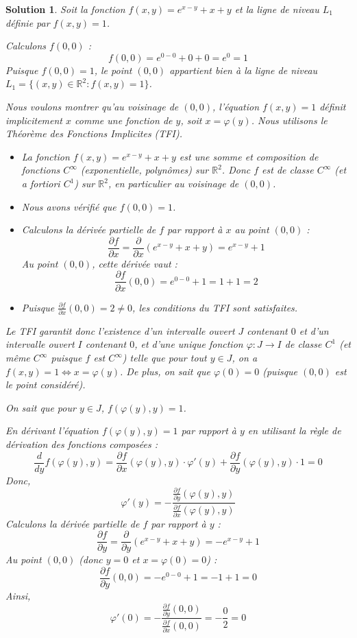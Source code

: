 \documentclass[10pt]{article}
\theoremstyle{frenchstyle}
\newtheorem{solution}{Solution}
\begin{document}
\begin{solution}

	Soit la fonction $f(x,y) = e^{x - y} + x + y$ et la ligne de niveau $L_1$ définie par $f(x,y) = 1$.

	Calculons $f(0,0)$ :
	\[
		f(0,0) = e^{0-0} + 0 + 0 = e^0 = 1
	\]
	Puisque $f(0,0) = 1$, le point $(0,0)$ appartient bien à la ligne de niveau $L_1 = \{(x,y) \in \mathbb{R}^2 : f(x,y) = 1\}$.

	Nous voulons montrer qu'au voisinage de $(0,0)$, l'équation $f(x,y) = 1$ définit implicitement $x$ comme une fonction de $y$, soit $x = \varphi(y)$. Nous utilisons le Théorème des Fonctions Implicites (TFI).
	\begin{itemize}
		\item La fonction $f(x,y) = e^{x-y} + x + y$ est une somme et composition de fonctions $C^\infty$ (exponentielle, polynômes) sur $\mathbb{R}^2$. Donc $f$ est de classe $C^\infty$ (et a fortiori $C^1$) sur $\mathbb{R}^2$, en particulier au voisinage de $(0,0)$.
		\item Nous avons vérifié que $f(0,0) = 1$.
		\item Calculons la dérivée partielle de $f$ par rapport à $x$ au point $(0,0)$ :
		      \[
			      \frac{\partial f}{\partial x} = \frac{\partial}{\partial x} (e^{x-y} + x + y) = e^{x-y} + 1
		      \]
		      Au point $(0,0)$, cette dérivée vaut :
		      \[
			      \frac{\partial f}{\partial x}(0,0) = e^{0-0} + 1 = 1 + 1 = 2
		      \]
		\item Puisque $\frac{\partial f}{\partial x}(0,0) = 2 \neq 0$, les conditions du TFI sont satisfaites.
	\end{itemize}
	Le TFI garantit donc l'existence d'un intervalle ouvert $J$ contenant $0$ et d'un intervalle ouvert $I$ contenant $0$, et d'une unique fonction $\varphi : J \to I$ de classe $C^1$ (et même $C^\infty$ puisque $f$ est $C^\infty$) telle que pour tout $y \in J$, on a $f(x,y) = 1 \iff x = \varphi(y)$. De plus, on sait que $\varphi(0) = 0$ (puisque $(0,0)$ est le point considéré).

	On sait que pour $y \in J$, $f(\varphi(y), y) = 1$.

	En dérivant l'équation $f(\varphi(y), y) = 1$ par rapport à $y$ en utilisant la règle de dérivation des fonctions composées :
	\[
		\frac{d}{dy} f(\varphi(y), y) = \frac{\partial f}{\partial x}(\varphi(y), y) \cdot \varphi'(y) + \frac{\partial f}{\partial y}(\varphi(y), y) \cdot 1 = 0
	\]
	Donc,
	\[
		\varphi'(y) = - \frac{\frac{\partial f}{\partial y}(\varphi(y), y)}{\frac{\partial f}{\partial x}(\varphi(y), y)}
	\]
	Calculons la dérivée partielle de $f$ par rapport à $y$ :
	\[
		\frac{\partial f}{\partial y} = \frac{\partial}{\partial y} (e^{x-y} + x + y) = -e^{x-y} + 1
	\]
	Au point $(0,0)$ (donc $y=0$ et $x=\varphi(0)=0$) :
	\[
		\frac{\partial f}{\partial y}(0,0) = -e^{0-0} + 1 = -1 + 1 = 0
	\]
	Ainsi,
	\[
		\varphi'(0) = - \frac{\frac{\partial f}{\partial y}(0,0)}{\frac{\partial f}{\partial x}(0,0)} = - \frac{0}{2} = 0
	\]


\end{solution}
\end{document}
